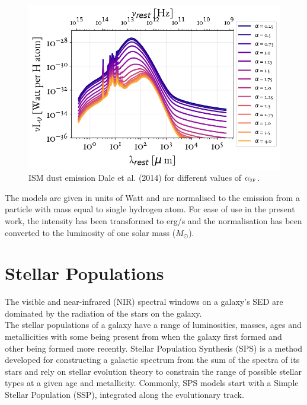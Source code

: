\begin{figure}
  \includegraphics[width = \textwidth]{figures/Templates/Dust_ISM.png}
 \caption{ISM dust emission Dale et al. (2014)\cite{Dale2014} for different values of $\alpha_{\text{\tiny{SF}}}$. }
  \label{fig:Dust_temp}
\end{figure}
The models are given in units of Watt and are normalised to the emission from a particle with mass equal to single hydrogen atom. For ease of use in the present work, the intensity has been transformed to erg/s and the normalisation has been converted to the luminosity of one solar mass ($M_\odot$).

\section{Stellar Populations} \label{sec:SED/Stellar}

The visible and near-infrared (NIR) spectral windows on a galaxy's SED are dominated by the radiation of the stars on the galaxy. \\
The stellar populations of a galaxy have a range of luminosities, masses, ages and metallicities with some being present from when the galaxy first formed and other being formed more recently. Stellar Population Synthesis (SPS) is a method developed for constructing a galactic spectrum from the sum of the spectra of its stars and rely on stellar evolution theory to constrain the range of possible stellar types at a given age and metallicity. Commonly, SPS models start with a Simple Stellar Population (SSP), integrated along the evolutionary track.

